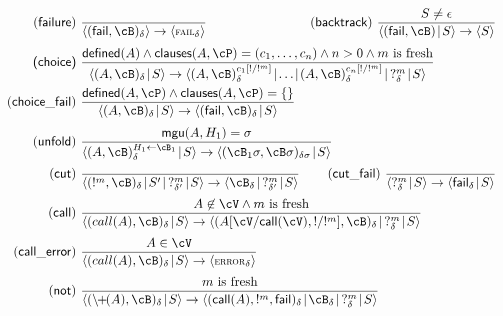 \documentclass[fleqn]{tlp}
\newcommand{\mgu}{\mathsf{mgu}}
\newcommand{\defined}{\mathsf{defined}}
\newcommand{\call}{\mathsf{call}}
\newcommand{\fail}{\mathsf{fail}}
\newcommand{\clauses}{\mathsf{clauses}}
\newcommand{\midd}{\!\mid\!}
\newcommand{\failsc}{\mbox{\footnotesize \textsc{fail}}}
\newcommand{\errorsc}{\mbox{\footnotesize \textsc{error}}}
\def \tuple#1{\langle #1 \rangle}
\begin{document}
\begin{appendix}
\begin{figure}[b]
\[\begin{array}{r@{~}l}
     \mathsf{(failure)} & {\displaystyle 
      \frac{~} 
        {\tuple{(\fail,\cB)_\delta} \to \tuple{\failsc_\delta}}
        }
        \hfill\hspace{5ex}
    \mathsf{(backtrack)} ~ {\displaystyle 
      \frac{S\neq\epsilon} 
        {\tuple{(\fail,\cB)\midd S} \to \tuple{S}}
        }\\[3ex]

     \textsf{(choice)} &  {\displaystyle 
      \frac{\defined(A) \wedge
        \clauses(A,\cP) = (c_1,\ldots,c_n)\wedge n>0 \wedge m~\mbox{is fresh}} 
        {\tuple{(A,\cB)_\delta\midd S} \to
          \tuple{(A,\cB)_\delta^{c_1[!/!^m]} \midd \ldots\midd
          (A,\cB)_\delta^{c_n[!/!^m]}\midd ~?^m_\delta\midd  S}}
        }\\[3ex]

    \mathsf{(choice\_fail)} & {\displaystyle 
      \frac{\defined(A,\cP)\wedge \clauses(A,\cP)=\emptyset} 
        {\tuple{(A,\cB)_\delta\midd S} \to \tuple{(\fail,\cB)_\delta\midd S}}
        }\\[3ex]

    \mathsf{(unfold)} & {\displaystyle 
      \frac{\mgu(A,H_1)=\sigma} 
        {\tuple{(A,\cB)_\delta^{H_1\leftarrow\cB_1}\midd S}
          \to \tuple{(\cB_1\sigma,\cB\sigma)_{\delta\sigma}\midd S}}
        } \\[3ex]

    \mathsf{(cut)} & {\displaystyle 
      \frac{~} 
        {\tuple{(!^m,\cB)_\delta\midd S'\midd ~?^m_{\delta'}\midd S}
          \to \tuple{\cB_{\delta}\midd~?^m_{\delta'}\midd S}}
        } \hfill\hspace{5ex}
    \mathsf{(cut\_fail)} ~ {\displaystyle 
      \frac{~} 
        {\tuple{?^m_\delta \midd S}
          \to \tuple{\fail_\delta \midd S}}
        } \\[3ex]

    \mathsf{(call)} & {\displaystyle 
      \frac{A\not\in\cV\wedge m~\mbox{is fresh}} 
        {\tuple{(call(A),\cB)_\delta\midd S}
          \to
          \tuple{(A[\cV/\call(\cV),!/!^m],\cB)_{\delta}\midd ~?^m_{\delta}\midd S}}
        } \\[3ex]

    \mathsf{(call\_error)} & {\displaystyle 
      \frac{A\in\cV} 
        {\tuple{(call(A),\cB)_\delta\midd S}
          \to
          \tuple{\errorsc_{\delta}}}
        } \\[3ex]

    \mathsf{(not)} & {\displaystyle 
      \frac{m~\mbox{is fresh}} 
        {\tuple{(\backslash\!\!+\!\!(A),\cB)_\delta\midd S}
          \to
          \tuple{(\call(A),!^m,\fail)_{\delta}\midd \cB_\delta\midd ~?^m_\delta\midd S}}
        } \\[3ex]


\end{array}\]
\end{figure}
\end{appendix}
\end{document}
